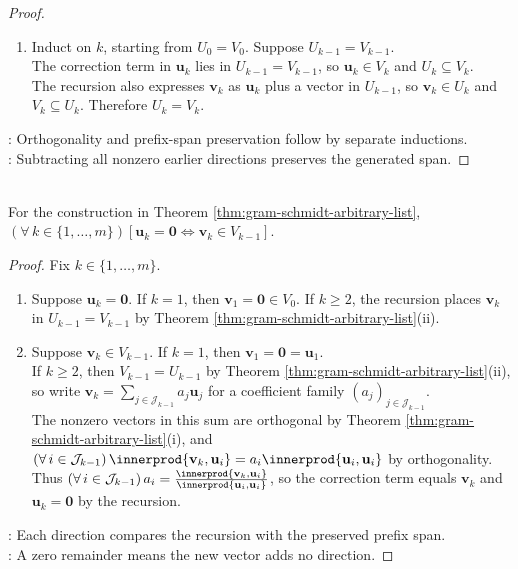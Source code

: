 \begin{theorem}
\begin{proof}
\begin{enumerate}[label=(\roman*)]
The reverse orthogonality relation holds by Proposition \ref{prop:orthogonality-and-zero}(i), so the full list is orthogonal.
\item[$(ii)$] Induct on $k$, starting from $U_0=V_0$. Suppose $U_{k-1}=V_{k-1}$.\\
The correction term in $\mathbf{u}_k$ lies in $U_{k-1}=V_{k-1}$, so $\mathbf{u}_k\in V_k$ and $U_k\subseteq V_k$.\\
The recursion also expresses $\mathbf{v}_k$ as $\mathbf{u}_k$ plus a vector in $U_{k-1}$, so $\mathbf{v}_k\in U_k$ and $V_k\subseteq U_k$. Therefore $U_k=V_k$.
\end{enumerate}
: Orthogonality and prefix-span preservation follow by separate inductions.\\
: Subtracting all nonzero earlier directions preserves the generated span.
\end{proof}
\end{theorem}

\begin{corollary} \label{cor:gram-schmidt-zero-remainders} \\
For the construction in Theorem \ref{thm:gram-schmidt-arbitrary-list}, $(\forall\,k\in\{1,\ldots,m\})[\mathbf{u}_k=\mathbf{0}\Longleftrightarrow\mathbf{v}_k\in V_{k-1}]$.
\begin{proof}
Fix $k\in\{1,\ldots,m\}$.
\begin{enumerate}[label=\roman*.]
\setlength{\itemsep}{0pt}
\item[$(\Rightarrow)$] Suppose $\mathbf{u}_k=\mathbf{0}$. If $k=1$, then $\mathbf{v}_1=\mathbf{0}\in V_0$. If $k\geq2$, the recursion places $\mathbf{v}_k$ in $U_{k-1}=V_{k-1}$ by Theorem \ref{thm:gram-schmidt-arbitrary-list}(ii).
\item[$(\Leftarrow)$] Suppose $\mathbf{v}_k\in V_{k-1}$. If $k=1$, then $\mathbf{v}_1=\mathbf{0}=\mathbf{u}_1$.\\
If $k\geq2$, then $V_{k-1}=U_{k-1}$ by Theorem \ref{thm:gram-schmidt-arbitrary-list}(ii), so write $\mathbf{v}_k=\sum\limits_{j\in\mathcal{J}_{k-1}}a_j\mathbf{u}_j$ for a coefficient family $(a_j)_{j\in\mathcal{J}_{k-1}}$.\\
The nonzero vectors in this sum are orthogonal by Theorem \ref{thm:gram-schmidt-arbitrary-list}(i), and $(\forall\,i\in\mathcal{J}_{k-1})\,\innerprod{\mathbf{v}_k,\mathbf{u}_i}=a_i\innerprod{\mathbf{u}_i,\mathbf{u}_i}$ by orthogonality.\\
Thus $(\forall\,i\in\mathcal{J}_{k-1})\,a_i=\frac{\innerprod{\mathbf{v}_k,\mathbf{u}_i}}{\innerprod{\mathbf{u}_i,\mathbf{u}_i}}$, so the correction term equals $\mathbf{v}_k$ and $\mathbf{u}_k=\mathbf{0}$ by the recursion.\par
\end{enumerate}
: Each direction compares the recursion with the preserved prefix span.\\
: A zero remainder means the new vector adds no direction.
\end{proof}
\end{corollary}

